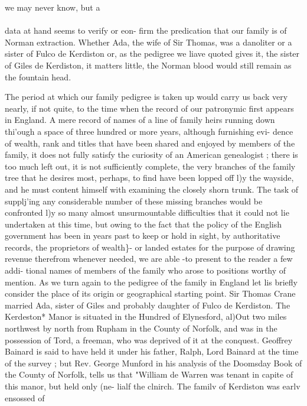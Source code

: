 \documentclass{book}
\begin{document}
we may never know, but a\\\\ data at hand seems to verify or eon- 
firm the predication that our family is of Norman extraction. 
Whether Ada, the wife of Sir Thomas, was a danoliter or a sister 
of Fulco de Kerdiston or, as the pedigree we liave quoted gives 
it, the sister of Giles de Kerdiston, it matters little, the Norman 
blood would still remain as the fountain head. 

The period at which our family pedigree is taken up would 
carry us back very nearly, if not quite, to the time when the 
record of our patronymic first appears in England. A mere 
record of names of a line of family heirs running down thi'ough a 
space of three hundred or more years, although furnishing evi- 
dence of wealth, rank and titles that have been shared and 
enjoyed by members of the family, it does not fully satisfy the 
curiosity of an American genealogist ; there is too much left out, 
it is not sufficiently complete, the very branches of the family 
tree that he desires most, perhaps, to find have been lopped off l)y 
the wayside, and he must content himself with examining the 
closely shorn trunk. The task of supplj'ing any considerable 
number of these missing branches would be confronted l)y so 
many almost unsurmountable difficulties that it could not lie 
undertaken at this time, but owing to the fact that the policy of 
the English government has been in years past to keep or hold in 
sight, by authoritative records, the proprietors of wealth\}- or 
landed estates for the purpose of drawing revenue therefrom 
whenever needed, we are able -to present to the reader a few addi- 
tional names of members of the family who arose to positions 
worthy of mention. As we turn again to the pedigree of the 
family in England let lis briefly consider the place of its origin 
or geographical starting point. Sir Thomas Crane married Ada, 
sister of Giles and probably daughter of Fulco de Kerdiston. 
The Kerdeston* Manor is situated in the Hundred of Elynesford, 
al)Out two miles northwest by north from Rupham in the County 
of Norfolk, and was in the possession of Tord, a freeman, who 
was deprived of it at the conquest. Geoffrey Bainard is said to 
have held it under his father, Ralph, Lord Bainard at the time of 
the survey ; but Rev. George Munford in his analysis of the 
Doomsday Book of the County of Norfolk, tells us that "William 
de Warren was tenant in capite of this manor, but held only (ne- 
lialf the clnirch. The familv of Kerdiston was earlv ensossed of 
\end{document}
